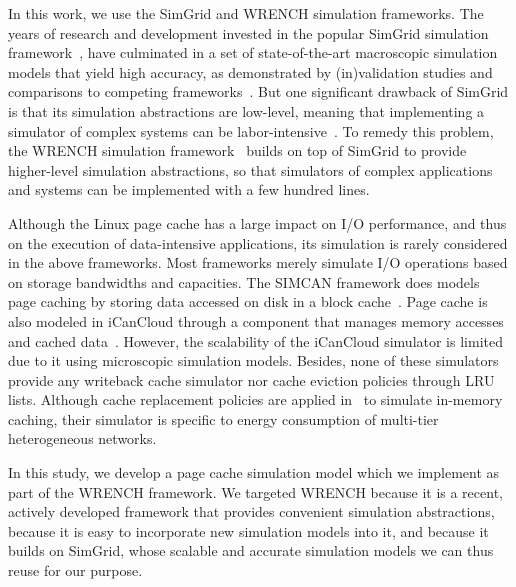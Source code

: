 \documentclass[conference]{IEEEtran}
\newcommand{\simgrid}{SimGrid\xspace}
\newcommand{\wrench}{WRENCH\xspace}
\begin{document}
        In this  work, we use the \simgrid and \wrench simulation
        frameworks.  The years of research and development invested in
        the popular \simgrid simulation framework~\cite{casanova2014simgrid}, have
        culminated in a set of state-of-the-art macroscopic simulation
        models that yield high accuracy, as demonstrated by
        (in)validation studies and comparisons to competing
        frameworks~\cite{smpi_validity, velhoTOMACS2013, simutool_09,
        nstools_07, lebre2015, pouilloux:hal-01197274,
        smpi_tpds2017,  7885814, 8048921, 7384330}.  But one
        significant drawback of \simgrid is that its simulation
        abstractions are low-level, meaning that implementing a
        simulator of complex systems can be
        labor-intensive~\cite{kecskemeti_2014}. To remedy this problem,
        the \wrench simulation framework~\cite{casanova2020fgcs}
        builds on top of \simgrid to provide higher-level simulation
        abstractions, so that simulators of complex applications and
        systems can be implemented with a few hundred lines.

        Although the Linux page cache has a large impact on I/O
        performance, and thus on the execution of data-intensive
        applications, its simulation is rarely considered in the above
        frameworks.  Most frameworks merely simulate I/O operations
        based on storage bandwidths and capacities.  The SIMCAN
        framework does models page caching by storing data accessed on
        disk in a block cache~\cite{nunez2012simcan}.  Page cache is
        also modeled in iCanCloud through a component that manages
        memory accesses and cached data~\cite{nunez2012icancloud}.
        However, the scalability of the iCanCloud simulator is limited
        due to it using  microscopic simulation models.  Besides, none
        of these simulators provide any writeback cache simulator nor
        cache eviction policies through LRU lists.  Although cache
        replacement policies are applied in~\cite{xu2018saving} to
        simulate in-memory caching, their simulator is specific to
        energy consumption of multi-tier heterogeneous networks.

        In this study, we develop a page cache simulation model which we implement
        as part of the \wrench framework. We targeted \wrench because it is a
        recent, actively developed framework that provides convenient simulation
        abstractions, because it is easy to incorporate new simulation models
        into it, and because it builds on \simgrid, whose scalable and accurate
        simulation models we can thus reuse for our purpose. 
\end{document}
